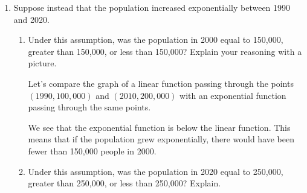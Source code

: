 \documentclass{article}
\begin{document}
\begin{enumerate}
\begin{enumerate}
  \item
    Suppose instead that the population increased exponentially between 1990 and 2020.

    \begin{enumerate}
    \item 
      \begin{problem}[\vfill]
        Under this assumption, was the population in 2000 equal to 150,000, greater than 150,000, or less than 150,000? Explain your reasoning with a picture.
      \end{problem}

      \begin{solution}
        Let's compare the graph of a linear function passing through the points
        $(1990, 100,000)$ and $(2010, 200,000)$ with an exponential function passing
        through the same points.
        \begin{center}
        \end{center}
        We see that the exponential function is below the linear function. This means that if
        the population grew exponentially, there would have been fewer than 150,000 people
        in 2000.
      \end{solution}

    \item
      \begin{problem}[\nstretch{0.25}]
        Under this assumption, was the population in 2020 equal to 250,000, greater than 250,000, or less than 250,000? Explain.
      \end{problem}


\end{enumerate}
\end{enumerate}
\end{enumerate}
\end{document}
